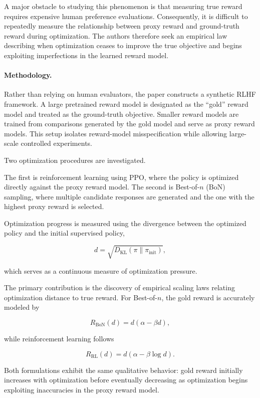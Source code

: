 \documentclass[11pt]{article}
\begin{document}
A major obstacle to studying this phenomenon is that measuring true reward requires expensive human preference evaluations. Consequently, it is difficult to repeatedly measure the relationship between proxy reward and ground-truth reward during optimization. The authors therefore seek an empirical law describing when optimization ceases to improve the true objective and begins exploiting imperfections in the learned reward model.

\paragraph{Methodology.}

Rather than relying on human evaluators, the paper constructs a synthetic RLHF framework. A large pretrained reward model is designated as the ``gold'' reward model and treated as the ground-truth objective. Smaller reward models are trained from comparisons generated by the gold model and serve as proxy reward models. This setup isolates reward-model misspecification while allowing large-scale controlled experiments.

Two optimization procedures are investigated.

The first is reinforcement learning using PPO, where the policy is optimized directly against the proxy reward model. The second is Best-of-$n$ (BoN) sampling, where multiple candidate responses are generated and the one with the highest proxy reward is selected.

Optimization progress is measured using the divergence between the optimized policy and the initial supervised policy,

\[
d=\sqrt{D_{\mathrm{KL}}(\pi\|\pi_{\mathrm{init}})},
\]

which serves as a continuous measure of optimization pressure.

The primary contribution is the discovery of empirical scaling laws relating optimization distance to true reward. For Best-of-$n$, the gold reward is accurately modeled by

\[
R_{\mathrm{BoN}}(d)
=
d(\alpha-\beta d),
\]

while reinforcement learning follows

\[
R_{\mathrm{RL}}(d)
=
d(\alpha-\beta\log d).
\]

Both formulations exhibit the same qualitative behavior: gold reward initially increases with optimization before eventually decreasing as optimization begins exploiting inaccuracies in the proxy reward model.
\end{document}
